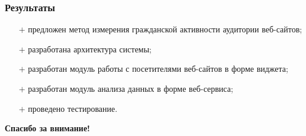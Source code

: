 \documentclass{beamer}
\begin{document}
\begin{frame}
\frametitle{Результаты}
\begin{itemize}
  \item[$+$] предложен метод измерения гражданской активности аудитории веб-сайтов;
  \item[$+$] разработана архитектура системы;
  \item[$+$] разработан модуль работы с посетителями веб-сайтов в форме виджета;
  \item[$+$] разработан модуль анализа данных в форме веб-сервиса;
  \item[$+$] проведено тестирование.
\end{itemize}

\begin{center}\bf\LARGE
Спасибо за внимание!
\end{center}

\end{frame}
\end{document}
